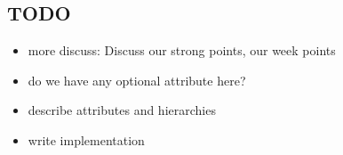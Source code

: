 \subsection{TODO} %
\label{sub:TODO}

\begin{itemize}
    \item more discuss: Discuss our strong points, our week points
    \item do we have any optional attribute here?
    \item describe attributes and hierarchies
    \item write implementation
\end{itemize}

